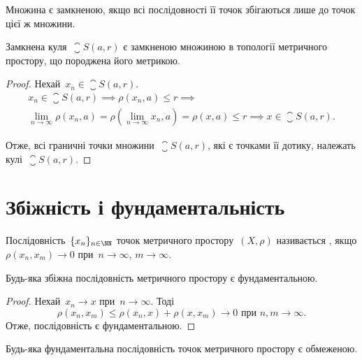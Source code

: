 \begin{corollary}
Множина є замкненою, якщо всі
послідовності її точок збігаються лише до точок цієї ж
множини.
\end{corollary}

\begin{theorem}
Замкнена куля~$\closure S(a, r)$ є замкненою
множиною в топології метричного простору, що
породжена його метрикою.
\end{theorem}

\begin{proof}
Нехай~$x_n \in \closure S(a, r)$.
\begin{multline*}
    x_n \in \closure S(a, r) \implies
    \rho(x_n, a) \le r \implies \\
    \lim_{n \to \infty} \rho(x_n, a) = \rho\left(\lim_{n \to \infty} x_n, a\right) = \rho(x, a) \le r \implies
    x \in \closure S(a, r).
\end{multline*}

Отже, всі граничні точки множини~$\closure S(a, r)$, які є точками
її дотику, належать кулі~$\closure S(a, r)$. 
\end{proof}

\section{Збіжність і фундаментальність}

\begin{definition}
Послідовність~$\{x_n\}_{n \in \NN}$ точок метричного
простору~$(X, \rho)$ називається , якщо
$\rho(x_n, x_m) \to 0$ при~$n \to \infty$, $m \to \infty$.
\end{definition}

\begin{lemma}
Будь-яка збіжна послідовність метричного
простору є фундаментальною.
\end{lemma}

\begin{proof}
Нехай~$x_n \to x$ при~$n \to \infty$. Тоді
\begin{equation*}
    \rho(x_n, x_m) \le \rho(x_n, x) + \rho(x, x_m) \to 0 \text{ при } n, m \to \infty.
\end{equation*}
Отже, послідовність є фундаментальною. 
\end{proof}

\begin{lemma}
Будь-яка фундаментальна послідовність
точок метричного простору є обмеженою.
\end{lemma}


